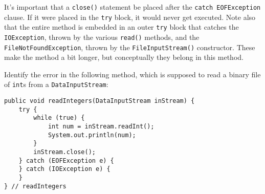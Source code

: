 It's important that a {\tt close()} statement be placed after the
{\tt catch EOF\-Exception} clause.  If it were placed in the {\tt try} block,
it would never get executed.   Note also that the entire method is
embedded in an outer {\tt try} block that catches the
{\tt IOException}, thrown by the various {\tt read()} methods, and the
{\tt FileNotFoundException}, thrown by the {\tt FileInputStream()}
constructor.  These make the method a bit longer, but conceptually
they belong in this method.



\pagebreak
{}
\label{self-study-exercise}
\begin{SSTUDY}

\item  Identify the error in the following method, which is supposed to read
a binary file of {\tt int}s from a {\tt DataInputStream}:

\begin{jjjlisting}
\begin{lstlisting}
public void readIntegers(DataInputStream inStream) {
    try {
        while (true) {
            int num = inStream.readInt();
            System.out.println(num);
        }
        inStream.close();
    } catch (EOFException e) {
    } catch (IOException e) {
    }
} // readIntegers
\end{lstlisting}
\end{jjjlisting}
\end{SSTUDY}


